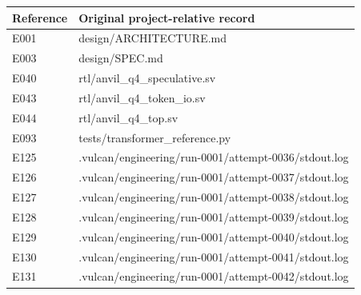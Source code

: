 \documentclass[11pt,a4paper]{article}
\begin{document}
{\small\renewcommand{\arraystretch}{1.18}\begin{longtable}{@{}L{0.12\textwidth}|L{0.82\textwidth}@{}}\toprule

\textbf{Reference} & \textbf{Original project-relative record}\\\midrule\endhead

E001 & design/\allowbreak{}ARCHITECTURE.md\\[2pt]\hline

E003 & design/\allowbreak{}SPEC.md\\[2pt]\hline

E040 & rtl/\allowbreak{}anvil\_\allowbreak{}q4\_\allowbreak{}speculative.sv\\[2pt]\hline

E043 & rtl/\allowbreak{}anvil\_\allowbreak{}q4\_\allowbreak{}token\_\allowbreak{}io.sv\\[2pt]\hline

E044 & rtl/\allowbreak{}anvil\_\allowbreak{}q4\_\allowbreak{}top.sv\\[2pt]\hline

E093 & tests/\allowbreak{}transformer\_\allowbreak{}reference.py\\[2pt]\hline

E125 & .vulcan/\allowbreak{}engineering/\allowbreak{}run-0001/\allowbreak{}attempt-0036/\allowbreak{}stdout.log\\[2pt]\hline

E126 & .vulcan/\allowbreak{}engineering/\allowbreak{}run-0001/\allowbreak{}attempt-0037/\allowbreak{}stdout.log\\[2pt]\hline

E127 & .vulcan/\allowbreak{}engineering/\allowbreak{}run-0001/\allowbreak{}attempt-0038/\allowbreak{}stdout.log\\[2pt]\hline

E128 & .vulcan/\allowbreak{}engineering/\allowbreak{}run-0001/\allowbreak{}attempt-0039/\allowbreak{}stdout.log\\[2pt]\hline

E129 & .vulcan/\allowbreak{}engineering/\allowbreak{}run-0001/\allowbreak{}attempt-0040/\allowbreak{}stdout.log\\[2pt]\hline

E130 & .vulcan/\allowbreak{}engineering/\allowbreak{}run-0001/\allowbreak{}attempt-0041/\allowbreak{}stdout.log\\[2pt]\hline

E131 & .vulcan/\allowbreak{}engineering/\allowbreak{}run-0001/\allowbreak{}attempt-0042/\allowbreak{}stdout.log\\[2pt]\hline


\end{longtable}}
\end{document}
